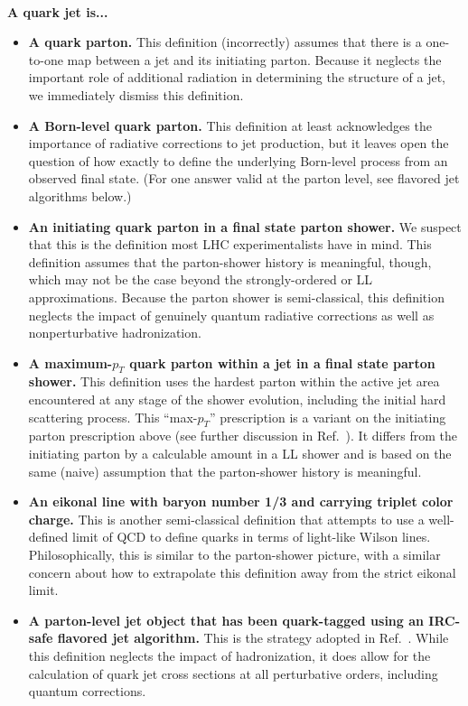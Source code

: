 \documentclass[11pt,letterpaper]{article}
\DeclareRobustCommand{\Ref}[1]{Ref.~\cite{#1}}
\begin{document}
~\\
\noindent \textbf{A quark jet is...}
\begin{itemize}
\item \textbf{A quark parton.}  This definition (incorrectly) assumes that there is a one-to-one map between a jet and its initiating parton.  Because it neglects the important role of additional radiation in determining the structure of a jet, we immediately dismiss this definition.
\item \textbf{A Born-level quark parton.}  This definition at least acknowledges the importance of radiative corrections to jet production, but it leaves open the question of how exactly to define the underlying Born-level process from an observed final state.  (For one answer valid at the parton level, see flavored jet algorithms below.)
\item \textbf{An initiating quark parton in a final state parton
    shower.}  We suspect that this is the definition most LHC
  experimentalists have in mind.  This definition assumes that the parton-shower history is meaningful, though,
  which may not be the case beyond the strongly-ordered or
  LL approximations.  Because the parton shower is
  semi-classical, this definition neglects the impact of genuinely
  quantum radiative corrections as well as nonperturbative
  hadronization.
\item \textbf{A maximum-$p_T$ quark parton within a jet in a final state parton shower.}  This definition uses the hardest parton within the active jet area encountered at any stage of the shower evolution, including the initial hard scattering process.  This ``max-$p_T$'' prescription is a variant on the initiating parton prescription above (see further discussion in \Ref{Buckley:2015gua}).  It differs from the initiating parton by a calculable amount in a LL shower \cite{Dasgupta:2014yra} and is based on the same (naive) assumption that the parton-shower history is meaningful. 
\item \textbf{An eikonal line with baryon number 1/3 and carrying triplet color charge.}  This is another semi-classical definition that attempts to use a well-defined limit of QCD to define quarks in terms of light-like Wilson lines.  Philosophically, this is similar to the parton-shower picture, with a similar concern about how to extrapolate this definition away from the strict eikonal limit.
\item \textbf{A parton-level jet object that has been quark-tagged using an IRC-safe flavored jet algorithm.}  This is the strategy adopted in \Ref{Banfi:2006hf}.  While this definition neglects the impact of hadronization, it does allow for the calculation of quark jet cross sections at all perturbative orders, including quantum corrections.
\end{itemize}
\end{document}
